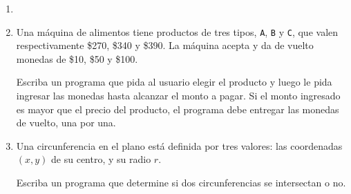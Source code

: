 \documentclass[11pt,spanish]{article}
\newcommand{\pond}[1]{[{\small\textbf{#1\%}}]}
\begin{document}
\begin{enumerate}[font=\Large\bfseries]
    \newpage
    \item
      \pond{25}

    \newpage
    \item
      \pond{25}
      Una máquina de alimentos tiene productos de tres tipos,
      \texttt{A}, \texttt{B} y \texttt{C},
      que valen respectivamente \$270, \$340 y \$390.
      La máquina acepta y da de vuelto monedas de \$10, \$50 y \$100.

      Escriba un programa que pida al usuario elegir el producto
      y luego le pida ingresar las monedas hasta alcanzar el monto a pagar.
      Si el monto ingresado es mayor que el precio del producto,
      el programa debe entregar las monedas de vuelto, una por una.

      \begin{minipage}[t]{.28\textwidth}
        
      \end{minipage}
      \hfill
      \begin{minipage}[t]{.28\textwidth}
        
      \end{minipage}
      \hfill
      \begin{minipage}[t]{.28\textwidth}
        
      \end{minipage}

    \newpage
    \item
      \pond{25}
      Una circunferencia en el plano está definida por tres valores:
      las coordenadas \((x, y)\) de su centro, y su radio \(r\).

      Escriba un programa que determine si dos circunferencias
      se intersectan o no.

      \def\grilla{%
        \draw[gray] (0, 0) grid (14, 10);
        \draw[-latex'] (0, 0) to (15, 0);
        \draw[-latex'] (0, 0) to (0, 11);
      }
      \newcommand\circulo[3]{%
        \node[inner sep=1pt, fill, circle] (p1) at (#1, #2) {};
        \draw[very thick] (p1) circle (#3 cm);
      }

      \hfill
      \hfill


\end{enumerate}
\end{document}
